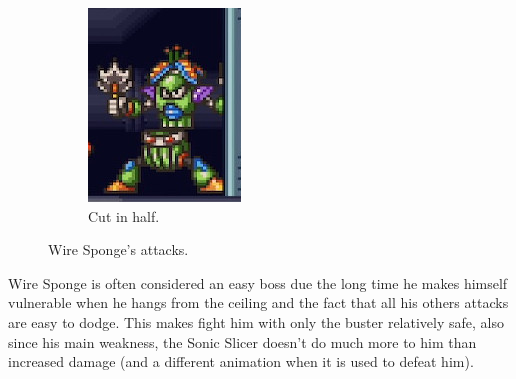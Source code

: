 \begin{figure}
\begin{subfigure}{0.28\linewidth}
	\centering
	\includegraphics[width=\linewidth]{figures/X2/Wire_sponge/sponge_cut.jpg}
	\caption{Cut in half.}
	\end{subfigure}

	\caption{Wire Sponge's attacks.}
\end{figure}

Wire Sponge is often considered an easy boss due the long time he makes himself vulnerable when he hangs from the ceiling and the fact that all his others attacks are easy to dodge. This makes fight him with only the buster relatively safe, also since his main weakness, the Sonic Slicer doesn't do much more to him than increased damage (and a different animation when it is used to defeat him).

